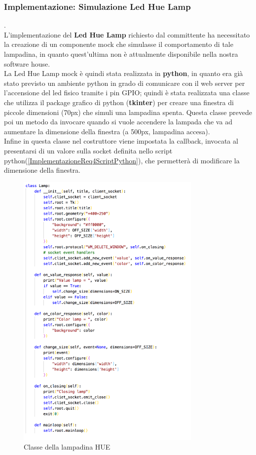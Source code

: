 \documentclass{llncs}
\begin{document}
\subsubsection{Implementazione: Simulazione Led Hue Lamp} .
\label{ImplementazioneReq4LHL}
\vspace*{1ex}
\\
L'implementazione del \textbf{Led Hue Lamp} richiesto dal committente ha necessitato la creazione di un componente mock che simulasse il comportamento di tale lampadina, in quanto quest'ultima non \`e attualmente disponibile nella nostra software house.\\
La Led Hue Lamp mock \`e quindi stata realizzata in \textbf{python}, in quanto era gi\`a stato previsto un ambiente python in grado di comunicare con il web server per l'accensione del led fisico tramite i pin GPIO; quindi \`e stata realizzata una classe che utilizza il package grafico di python (\textbf{tkinter}) per creare una finestra di piccole dimensioni (70px) che simuli una lampadina spenta. Questa classe prevede poi un metodo da invocare quando si vuole accendere la lampada che va ad aumentare la dimensione della finestra (a 500px, lampadina accesa).\\
Infine in questa classe nel costruttore viene impostata la callback, invocata al presentarsi di un valore sulla socket definita nello script python(\hyperref[ImplementazioneReq4ScriptPython]{\ref{ImplementazioneReq4ScriptPython}}), che permetter\`a di modificare la dimensione della finestra.\\
\begin{figure}
    \centering
    \includegraphics[width=0.8\textwidth]{Immagini/Requisito4/PythonHUELamp.png}
    \caption{Classe della lampadina HUE}
    \label{fig:ClasseLHL}
\end{figure}
\end{document}
